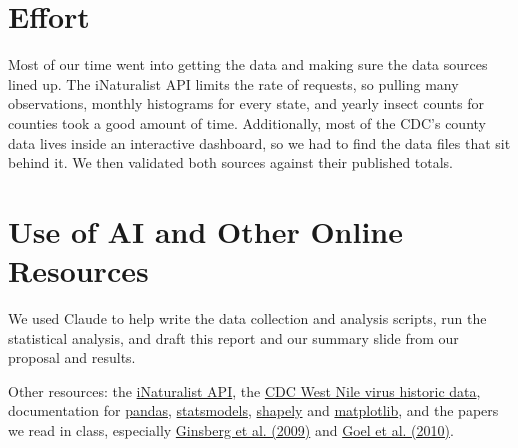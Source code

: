 \documentclass[11pt]{article}
\begin{document}



\appendix
\clearpage
\renewcommand{\thesection}{\Alph{section}}
\section{Effort}
Most of our time went into getting the data and making sure the data sources lined up. The iNaturalist API limits the rate of requests, so pulling many observations, monthly histograms for every state, and yearly insect counts for counties took a good amount of time. Additionally, most of the CDC's county data lives inside an interactive dashboard, so we had to find the data files that sit behind it. We then validated both sources against their published totals.

\section{Use of AI and Other Online Resources}
We used Claude\cite{claude} to help write the data collection and analysis scripts, run the statistical analysis, and draft this report and our summary slide from our proposal and results.

Other resources: the \href{https://api.inaturalist.org/v1/docs/}{iNaturalist API}\cite{inat_api}, the \href{https://www.cdc.gov/west-nile-virus/data-maps/historic-data.html}{CDC West Nile virus historic data}\cite{cdc_historic}, documentation for \href{https://pandas.pydata.org/docs/}{pandas}\cite{pandas}, \href{https://www.statsmodels.org/stable/}{statsmodels}\cite{statsmodels}, \href{https://shapely.readthedocs.io/}{shapely}\cite{shapely} and \href{https://matplotlib.org/stable/}{matplotlib}\cite{matplotlib}, and the papers we read in class, especially \href{https://doi.org/10.1038/nature07634}{Ginsberg et al. (2009)}\cite{ginsberg2009} and \href{https://doi.org/10.1073/pnas.1005962107}{Goel et al. (2010)}\cite{goel2010}.
\end{document}
